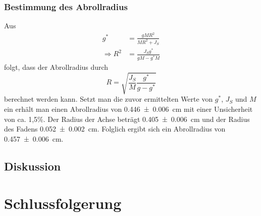 \documentclass[
	a4paper,
	12pt,
	pagesize,
	ngerman
]{scrartcl}
\begin{document}
	\subsubsection*{Bestimmung des Abrollradius}
	Aus
	\begin{align}
		g^* &= \frac{gMR^2}{MR^2+J_S} \\
		\Rightarrow R^2 &= \frac{J_Sg^*}{gM-g^*M}
	\end{align}
	folgt, dass der Abrollradius durch 
	\begin{equation}
		R = \sqrt{\frac{J_S}{M}\frac{g^*}{g-g^*}}
	\end{equation}
	berechnet werden kann. 
	Setzt man die zuvor ermittelten Werte von $g^*$, $J_S$ und $M$ ein erhält man einen Abrollradius von \SI{0,446 \pm 0,006}{cm} mit einer Unsicherheit von ca. 1,5\%. 
	Der Radius der Achse beträgt \SI{0,405 \pm 0,006}{cm} und der Radius des Fadens \SI{0,052\pm 0,002}{cm}. 
	Folglich ergibt sich ein Abrollradius von \SI{0,457 \pm 0,006}{cm}.



	\subsection{Diskussion}
	
	\section{Schlussfolgerung}
	
\end{document}
